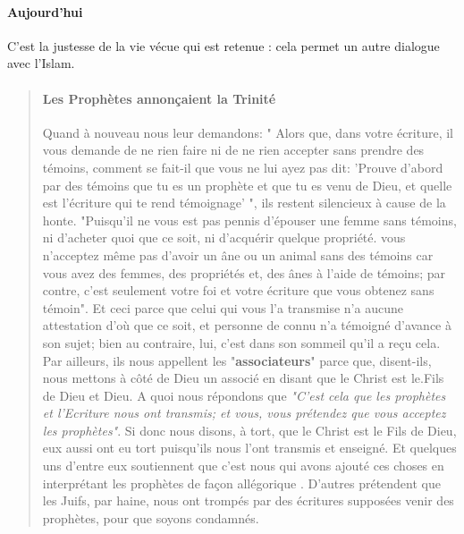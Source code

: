 \paragraph{Aujourd'hui} C'est la justesse de la vie vécue qui est retenue : cela permet un autre dialogue avec l'Islam.

\begin{quote}
    

\paragraph{Les Prophètes annonçaient la Trinité}
Quand à nouveau nous leur demandons: " Alors que, dans votre écriture, il vous demande de ne rien faire ni de ne rien accepter sans prendre des témoins, comment se fait-il que vous ne lui ayez pas dit: 'Prouve d'abord par des témoins que tu es un prophète et que tu es venu de Dieu, et quelle est l'écriture qui te rend
témoignage' ", ils restent silencieux à cause de la honte. "Puisqu'il ne vous est pas pennis d'épouser une femme sans témoins, ni d'acheter quoi que ce soit, ni d'acquérir quelque propriété. vous n'acceptez même pas d'avoir un âne ou un animal sans des témoins car vous avez des femmes, des propriétés et, des ânes à l'aide de témoins; par contre, c'est seulement votre foi et votre écriture que vous obtenez sans témoin". Et ceci parce que celui qui vous l'a transmise n'a aucune attestation d'où que ce soit, et personne de connu n'a témoigné d'avance à son sujet; bien au contraire, lui, c'est dans son sommeil qu'il a reçu cela. Par ailleurs, ils nous appellent les "\textbf{associateurs}" parce que, disent-ils, nous mettons à côté de Dieu un associé en disant que le Christ est le.Fils de Dieu et Dieu. A quoi nous répondons que \textit{"C'est cela que les prophètes et l'Ecriture nous ont transmis; et vous, vous prétendez que vous acceptez les prophètes"}. Si donc nous disons, à tort, que le Christ est le Fils de Dieu, eux aussi ont eu tort puisqu'ils nous l'ont transmis et enseigné. Et quelques uns d'entre eux soutiennent que c'est nous qui avons ajouté ces choses en interprétant les prophètes de façon allégorique . D'autres prétendent que les Juifs, par haine, nous ont trompés par des écritures supposées venir des prophètes, pour que soyons condamnés.
   
\end{quote}

